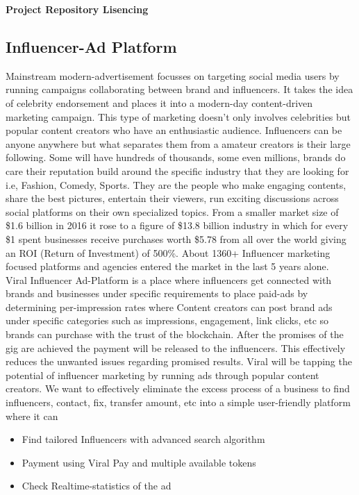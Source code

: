 \documentclass[10pt]{article}
\begin{document}
\textbf{Project Repository Lisencing}\\

\newpage

\subsection{Influencer-Ad Platform}

Mainstream modern-advertisement focusses on targeting social media users by running campaigns collaborating between brand and influencers. It takes the idea of celebrity endorsement and places it into a modern-day content-driven marketing campaign. This type of marketing doesn't only involves celebrities but popular content creators who have an enthusiastic audience. Influencers can be anyone anywhere but what separates them from a amateur creators is their large following. Some will have hundreds of thousands, some even millions, brands do care their reputation build around the specific industry that they are looking for i.e, Fashion, Comedy, Sports. They are the people who make engaging contents, share the best pictures, entertain their viewers, run exciting discussions across social platforms on their own specialized topics. From a smaller market size of \$1.6 billion in 2016 it rose to a figure of \$13.8 billion industry in which for every \$1 spent businesses receive purchases worth \$5.78 from all over the world giving an ROI (Return of Investment) of 500\%. About 1360+ Influencer marketing focused platforms and agencies entered the market in the last 5 years alone.\\

Viral Influencer Ad-Platform is a place where influencers get connected with brands and businesses under specific requirements to place paid-ads by determining per-impression rates where Content creators can post brand ads under specific categories such as impressions, engagement, link clicks, etc so brands can purchase with the trust of the blockchain. After the promises of the gig are achieved the payment will be released to the influencers. This effectively reduces the unwanted issues regarding promised results. Viral will be tapping the potential of influencer marketing by running ads through popular content creators. We want to effectively eliminate the excess process of a business to find influencers, contact, fix, transfer amount, etc into a simple user-friendly platform where it can
\begin{itemize}[leftmargin=+0.2in]
\item Find tailored Influencers with advanced search algorithm
\item Payment using Viral Pay and multiple available tokens
\item Check Realtime-statistics of the ad
\end{itemize}
\end{document}
